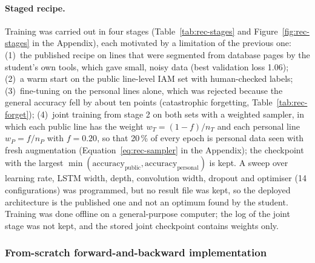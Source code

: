 \paragraph{Staged recipe.}
Training was carried out in four stages (Table~\ref{tab:rec-stages} and Figure~\ref{fig:rec-stages} in the Appendix), each motivated by a limitation of the previous one:
(1)~the published recipe on lines that were segmented from database pages by the student's own tools, which gave small, noisy data (best validation loss 1.06);
(2)~a warm start on the public line-level IAM set with human-checked labels;
(3)~fine-tuning on the personal lines alone, which was rejected because the general accuracy fell by about ten points (catastrophic forgetting, Table~\ref{tab:rec-forget});
(4)~joint training from stage 2 on both sets with a weighted sampler, in which each public line has the weight $w_T=(1-f)/n_T$ and each personal line $w_P=f/n_P$ with $f=0.20$, so that 20\,\% of every epoch is personal data seen with fresh augmentation (Equation~\ref{eq:rec-sampler} in the Appendix); the checkpoint with the largest $\min(\text{accuracy}_{\mathrm{public}},\text{accuracy}_{\mathrm{personal}})$ is kept.
A sweep over learning rate, LSTM width, depth, convolution width, dropout and optimiser (14 configurations) was programmed, but no result file was kept, so the deployed architecture is the published one and not an optimum found by the student.
Training was done offline on a general-purpose computer; the log of the joint stage was not kept, and the stored joint checkpoint contains weights only.

\subsubsection{From-scratch forward-and-backward implementation}
\label{sec:textrec-numpynn}

